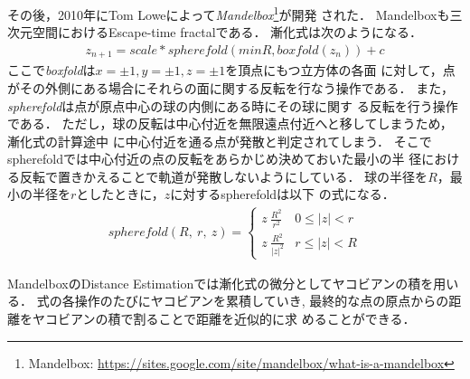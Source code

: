 その後，2010年にTom Loweによって\textit{Mandelbox}\footnote{Mandelbox:
\url{https://sites.google.com/site/mandelbox/what-is-a-mandelbox}}が開発
された．
Mandelboxも三次元空間におけるEscape-time fractalである．
漸化式は次のようになる．
\begin{align*}
 z_{n+1} = scale * spherefold(minR, boxfold(z_n)) + c
\end{align*}
ここで\textit{boxfold}は$x=\pm1, y=\pm1, z=\pm1$を頂点にもつ立方体の各面
に対して，点がその外側にある場合にそれらの面に関する反転を行なう操作である．
また，\textit{spherefold}は点が原点中心の球の内側にある時にその球に関す
る反転を行う操作である．
ただし，球の反転は中心付近を無限遠点付近へと移してしまうため，漸化式の計算途中
に中心付近を通る点が発散と判定されてしまう．
そこでspherefoldでは中心付近の点の反転をあらかじめ決めておいた最小の半
径における反転で置きかえることで軌道が発散しないようにしている．
球の半径を$R$，最小の半径を$r$としたときに，$z$に対するspherefoldは以下
の式になる．
\begin{align*}
 spherefold(R,~r,~z) = \begin{cases}
                  z~\frac{R^2}{r^2} & 0 \le |z| < r \\
                  z~\frac{R^2}{|z|^2} & r \le |z| < R
                 \end{cases}
\end{align*}

MandelboxのDistance Estimationでは漸化式の微分としてヤコビアンの積を用いる．
式の各操作のたびにヤコビアンを累積していき,
最終的な点の原点からの距離をヤコビアンの積で割ることで距離を近似的に求
めることができる．


